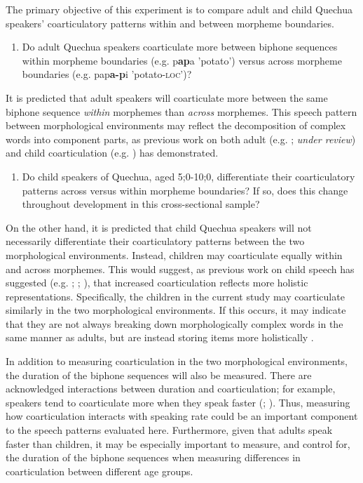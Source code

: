 \documentclass[a4paper,man,floatsintext,natbib,donotrepeattitle, apacite]{apa6}
\begin{document}
The primary objective of this experiment is to compare adult and child Quechua speakers' coarticulatory patterns within and between morpheme boundaries. 

\begin{enumerate}
    \item Do adult Quechua speakers coarticulate more between biphone sequences within morpheme boundaries (e.g. p\textbf{ap}a 'potato') versus across morpheme boundaries (e.g. pap\textbf{a-p}i 'potato-\textsc{loc}')? 
\end{enumerate}

It is predicted that adult speakers will coarticulate more between the same biphone sequence \textit{within} morphemes than \textit{across} morphemes. This speech pattern between morphological environments may reflect the decomposition of complex words into component parts, as previous work on both adult (e.g. \citealt{choEffectsMorphemeBoundaries2001}; \citeauthor{tomaschekHowAnticipatoryCoarticulation2019} \textit{under review}) and child coarticulation (e.g. \citealt{songEffectsCoarticulationMorphological2013}) has demonstrated.  

\begin{enumerate}[resume]
    \item Do child speakers of Quechua, aged 5;0-10;0, differentiate their coarticulatory patterns across versus within morpheme boundaries? If so, does this change throughout development in this cross-sectional sample? 
\end{enumerate}

On the other hand, it is predicted that child Quechua speakers will not necessarily differentiate their coarticulatory patterns between the two morphological environments. Instead, children may coarticulate equally within and across morphemes. This would suggest, as previous work on child speech has suggested (e.g. \citealt{noiraySpokenLanguageDevelopment2019}; \citealt{redfordGrammaticalWordProduction2018}; \citealt{zharkovaCoarticulationIndicatorSpeech2011}), that increased coarticulation reflects more holistic representations. Specifically, the children in the current study may coarticulate similarly in the two morphological environments. If this occurs, it may indicate that they are not always breaking down morphologically complex words in the same manner as adults, but are instead storing items more holistically \citep{redfordGrammaticalWordProduction2018}. 

In addition to measuring coarticulation in the two morphological environments, the duration of the biphone sequences will also be measured. There are acknowledged interactions between duration and coarticulation; for example, speakers tend to coarticulate more when they speak faster (\citealt{gayMechanismsControlSpeech1981}; \citealt{matthiesVariationAnticipatoryCoarticulation2001}). Thus, measuring how coarticulation interacts with speaking rate could be an important component to the speech patterns evaluated here. Furthermore, given that adults speak faster than children, it may be especially important to measure, and control for, the duration of the biphone sequences when measuring differences in coarticulation between different age groups. 
\end{document}
